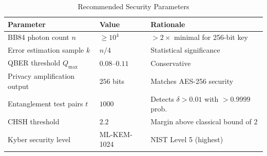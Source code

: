 \documentclass[11pt,a4paper]{article}
\theoremstyle{plain}
\theoremstyle{definition}
\theoremstyle{remark}
\begin{document}
\begin{table}[H]
\centering
\caption{Recommended Security Parameters}
\label{tab:params}
\begin{tabular}{@{}lll@{}}
\toprule
\textbf{Parameter} & \textbf{Value} & \textbf{Rationale} \\
\midrule
BB84 photon count $n$ & $\geq 10^4$ & $> 2\times$ minimal for 256-bit key \\
\midrule
Error estimation sample $k$ & $n/4$ & Statistical significance \\
\midrule
QBER threshold $Q_{\max}$ & $0.08$--$0.11$ & Conservative \\
\midrule
Privacy amplification output & $256$ bits & Matches AES-256 security \\
\midrule
Entanglement test pairs $t$ & $1000$ & Detects $\delta > 0.01$ with $>0.9999$ prob. \\
\midrule
CHSH threshold & $2.2$ & Margin above classical bound of 2 \\
\midrule
Kyber security level & ML-KEM-1024 & NIST Level 5 (highest) \\
\bottomrule
\end{tabular}
\end{table}
\end{document}
